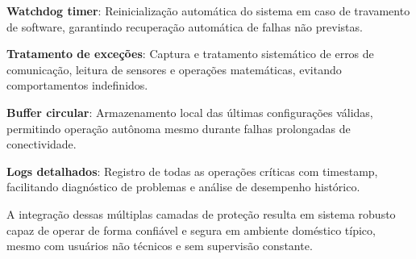 \textbf{Watchdog timer}: Reinicialização automática do sistema em caso de travamento de software, garantindo recuperação automática de falhas não previstas.

\textbf{Tratamento de exceções}: Captura e tratamento sistemático de erros de comunicação, leitura de sensores e operações matemáticas, evitando comportamentos indefinidos.

\textbf{Buffer circular}: Armazenamento local das últimas configurações válidas, permitindo operação autônoma mesmo durante falhas prolongadas de conectividade.

\textbf{Logs detalhados}: Registro de todas as operações críticas com timestamp, facilitando diagnóstico de problemas e análise de desempenho histórico.

A integração dessas múltiplas camadas de proteção resulta em sistema robusto capaz de operar de forma confiável e segura em ambiente doméstico típico, mesmo com usuários não técnicos e sem supervisão constante.
